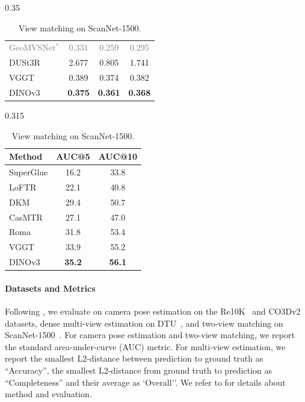 \begin{table}[t]
\begin{subtable}{0.35\linewidth}
\begin{tabular}{@{}lccc@{}}
        \textcolor{gray}{GeoMVSNet$^\ast$} & \textcolor{gray}{0.331} & \textcolor{gray}{0.259} & \textcolor{gray}{0.295} \\
        DUSt3R & 2.677 & 0.805 & 1.741 \\
        VGGT & 0.389 & 0.374 & 0.382 \\
        \midrule
        DINOv3  & \bf 0.375 & \bf 0.361 & \bf 0.368 \\
        \bottomrule
        \end{tabular}
    \end{subtable}%
    \hfill
    \begin{subtable}{0.315\linewidth}
        \centering
        \small
        \caption{View matching on ScanNet-1500.}
        \label{tab:results-vggt-view-matching}
        \setlength{\tabcolsep}{3pt}
        \begin{tabular}{@{}lcc@{}}
        \toprule
        Method & AUC@5 & AUC@10 \\
        \midrule
        SuperGlue & 16.2 & 33.8 \\
        LoFTR & 22.1 & 40.8 \\
        DKM & 29.4 & 50.7 \\
        CasMTR & 27.1 & 47.0 \\
        Roma & 31.8 & 53.4 \\
        VGGT & 33.9 & 55.2 \\
        \midrule
        DINOv3 & \bf 35.2 & \bf 56.1 \\
        \bottomrule
        \end{tabular}
    \end{subtable}
\end{table}

\paragraph{Datasets and Metrics}
Following \citet{wang2025vggt}, we evaluate on camera pose estimation on the Re10K~\citep{zhou2018stereo} and CO3Dv2~\citep{reizenstein2021common} datasets, dense multi-view estimation on DTU~\citep{jensen2014large}, and two-view matching on ScanNet-1500~\citep{dai2017scannet}.
For camera pose estimation and two-view matching, we report the standard area-under-curve (AUC) metric.  %
For multi-view estimation, we report the smallest L2-distance between prediction to ground truth as ``Accuracy'', the smallest L2-distance from ground truth to prediction as ``Completeness'' and their average as `Overall''.
We refer to \citet{wang2025vggt} for details about method and evaluation.

